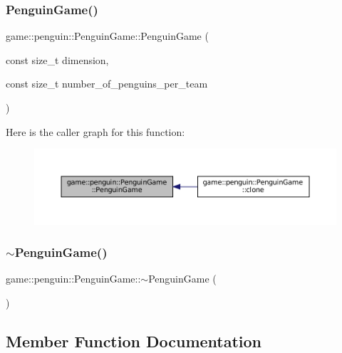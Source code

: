 \subsubsection{\texorpdfstring{Penguin\+Game()}{PenguinGame()}}
{\footnotesize\ttfamily game\+::penguin\+::\+Penguin\+Game\+::\+Penguin\+Game (\begin{DoxyParamCaption}\item[{const size\+\_\+t}]{dimension,  }\item[{const size\+\_\+t}]{number\+\_\+of\+\_\+penguins\+\_\+per\+\_\+team }\end{DoxyParamCaption})\hspace{0.3cm}{\ttfamily [explicit]}}

Here is the caller graph for this function\+:
\nopagebreak
\begin{figure}[H]
\begin{center}
\leavevmode
\includegraphics[width=350pt]{classgame_1_1penguin_1_1_penguin_game_ad5bc5305347a5c28df1f41407e53303c_icgraph}
\end{center}
\end{figure}
\mbox{\label{classgame_1_1penguin_1_1_penguin_game_aac05bdf14bf051096106ec7a0775c3ea}} 
\subsubsection{\texorpdfstring{$\sim$\+Penguin\+Game()}{~PenguinGame()}}
{\footnotesize\ttfamily game\+::penguin\+::\+Penguin\+Game\+::$\sim$\+Penguin\+Game (\begin{DoxyParamCaption}{ }\end{DoxyParamCaption})}



\subsection{Member Function Documentation}
\mbox{\label{classgame_1_1penguin_1_1_penguin_game_af255dc5b05ef5244ac864d4aa2d3be2e}} 

